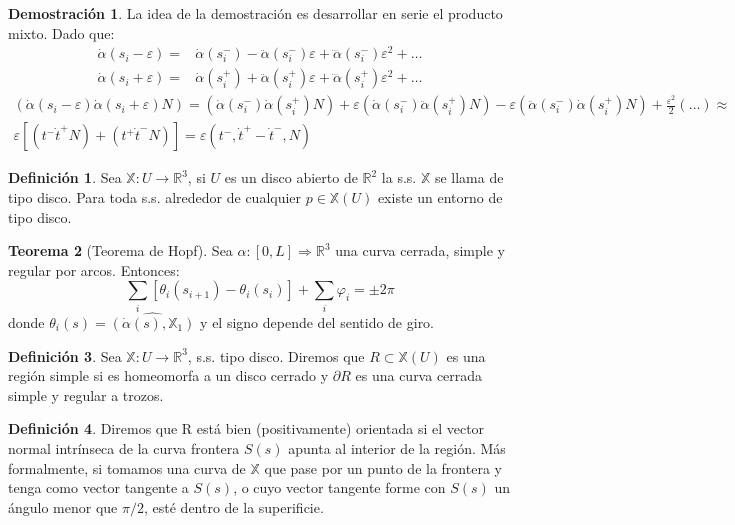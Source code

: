 \documentclass[twoside]{report}
\theoremstyle{definition}
\newtheorem{theorem}{Teorema}[section]
\newtheorem{defi}[theorem]{Definición}
\newtheorem*{dem}{Demostración}
\numberwithin{equation}{section}
\newcommand{\R}{\mathbb{R}}
\newcommand{\X}{\mathbb{X}}
\newcommand{\seaX}{\X:U\rightarrow\R^3}
\begin{document}
\begin{dem}
La idea de la demostración es desarrollar en serie el producto mixto. Dado que:
\begin{align*}
\dot{\alpha}(s_i-\varepsilon) = & \dot{\alpha}(s_i^-) - \ddot{\alpha}(s_i^-)\varepsilon + \dddot{\alpha}(s_i^-)\varepsilon^2 + \dotsc\\
\dot{\alpha}(s_i+\varepsilon) = & \dot{\alpha}(s_i^+) + \ddot{\alpha}(s_i^+)\varepsilon + \dddot{\alpha}(s_i^+)\varepsilon^2 + \dotsc
\end{align*}
\begin{gather*}
(\dot{\alpha}(s_i -\varepsilon) \dot{\alpha}(s_i+\varepsilon) N) = (\dot{\alpha}(s_i^-) \dot{\alpha}(s_i^+)  N) + \varepsilon (\dot{\alpha}(s_i^-) \ddot{\alpha}(s_i^+)  N) - \varepsilon(\ddot{\alpha}(s_i^-) \dot{\alpha}(s_i^+)  N) + \frac{\varepsilon^2}{2}(\dotsc) \approx\\
\varepsilon[(t^- \dot{t}^+N) + (t^+\dot{t}^-N)] = \varepsilon(t^-,\dot{t}^+ - \dot{t}^- , N)
\end{gather*}
\end{dem}
\begin{defi}
Sea $\X:U\rightarrow\R^3$, si $U$ es un disco abierto de $\R^2$ la s.s. $\X$ se llama de tipo disco. Para toda s.s. alrededor de cualquier $p\in\X(U)$ existe un entorno de tipo disco.
\end{defi}
\begin{theorem}[Teorema de Hopf] Sea $\alpha:[0,L]\Rightarrow\R^3$ una curva cerrada, simple y regular por arcos. Entonces:
\[
\sum_i [\theta_i(s_{i+1})-\theta_i(s_i)] + \sum_i \varphi_i = \pm 2\pi
\]
donde $\theta_i(s) =\widehat{(\dot{\alpha}(s),\mathbb{X}_1)}$ y el signo depende del sentido de giro. 
\end{theorem}
\begin{defi}
Sea $\seaX$, s.s. tipo disco. Diremos que $R \subset \X(U)$ es una región simple si es homeomorfa a un disco cerrado y $\partial R$ es una curva cerrada simple y regular a trozos.
\end{defi}
\begin{defi}
Diremos que R está bien (positivamente) orientada si el vector normal intrínseca de la curva frontera $S(s)$ apunta al interior de la región. Más formalmente, si tomamos una curva de $\X$ que pase por un punto de la frontera y tenga como vector tangente a $S(s)$, o cuyo vector tangente forme con $S(s)$ un ángulo menor que $\pi/2$, esté dentro de la superificie.
\end{defi}
\end{document}
